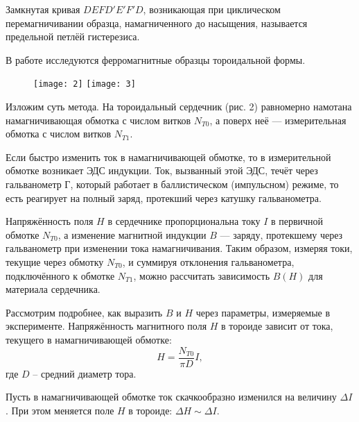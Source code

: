 Замкнутая кривая $DEFD'E'F'D$, возникающая
при циклическом перемагничивании
образца, намагниченного до насыщения,
называется предельной петлёй
гистерезиса.

В работе исследуются ферромагнитные
образцы тороидальной формы.

\begin{figure}[H]
    \centering
    \begin{floatrow}
        {\texttt{[image: 2]}}
        {
            \texttt{[image: 3]}
        }
        
    \end{floatrow}
\end{figure}
Изложим суть метода. На
тороидальный сердечник (рис. 2)
равномерно намотана намагничивающая
обмотка с числом витков $N_{T0}$, а поверх
неё — измерительная обмотка с числом
витков $N_{T1}$.

Если быстро изменить ток в
намагничивающей обмотке, то в
измерительной обмотке возникает ЭДС
индукции. Ток, вызванный этой ЭДС, течёт
через гальванометр Г, который работает в
баллистическом (импульсном) режиме, то
есть реагирует на полный заряд,
протекший через катушку гальванометра.

Напряжённость поля $H$ в сердечнике
пропорциональна току $I$ в первичной
обмотке $N_{T0}$, а изменение магнитной
индукции $B$ — заряду, протекшему через
гальванометр при изменении тока
намагничивания. Таким образом, измеряя
токи, текущие через обмотку $N_{T0}$, и
суммируя отклонения гальванометра,
подключённого к обмотке $N_{T1}$, можно
рассчитать зависимость $B(H)$ для
материала сердечника.

Рассмотрим подробнее, как выразить $B$
и $H$ 
через параметры, измеряемые в
эксперименте. Напряжённость магнитного
поля $H$ в тороиде зависит от тока,
текущего в намагничивающей обмотке:
\begin{equation}
    H = \frac{N_{T0}}{\pi D}I,
\end{equation}
где $D$ -- средний диаметр тора.

Пусть в намагничивающей обмотке ток
скачкообразно изменился на величину
$\Delta I$.
При этом меняется поле $H$ в тороиде:
$\Delta H \sim \Delta I$.

